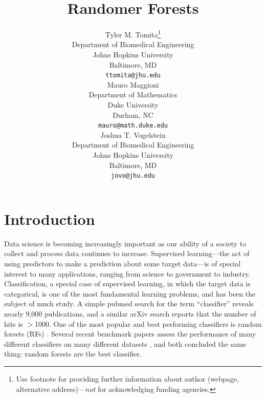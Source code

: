 \documentclass{article} %
\title{Randomer Forests}
\author{
Tyler M. Tomita\thanks{ Use footnote for providing further information
about author (webpage, alternative address)---\emph{not} for acknowledging
funding agencies.} \\
Department of Biomedical Engineering\\
Johns Hopkins University\\
Baltimore, MD \\
\texttt{ttomita@jhu.edu} \\
\And
Mauro Maggioni \\
Department of Mathematics \\
Duke University \\
Durham, NC \\
\texttt{mauro@math.duke.edu} \\
\And
Joshua T. Vogelstein \\
Department of Biomedical Engineering \\
Johns Hopkins University \\
Baltimore, MD \\
\texttt{jovo@jhu.edu} \\
}
\newcommand{\jovo}[1]{{\color{magenta}{\it jovo says: #1}}}
\begin{document}
\maketitle

\begin{abstract}
\jovo{please make this submittable asap.  this means include bib, put figures in the right place, anonymize, etc.}
\end{abstract}

\section{Introduction}

Data science is becoming increasingly important as our ability of a society to collect and process data continues to increase.  Supervised learning---the act of using predictors to make a prediction about some target data---is of special interest to many applications, ranging from science to government to industry.  Classification, a special case of supervised learning, in which the target data is categorical, is one of the most fundamental learning problems, and has been the subject of much study.  A simple pubmed search for the term ``classifier'' reveals nearly 9,000 publications, and a similar arXiv search reports that the number of hits is $>$1000.  One of the most popular and best performing classifiers is random forests (RFs) \cite{Breiman2001}.  Several recent benchmark papers assess the performance of many different classifiers on many different datasets \cite{Delgado2014,Caruana2008}, and both concluded the same thing: random forests are the best classifier.
\end{document}
